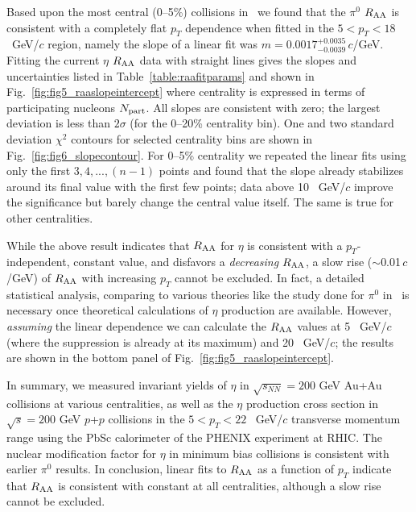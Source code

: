 \documentclass[aps,prc,superscriptaddress,showpacs,nofootinbib,floatfix,twocolumn]{revtex4}
\def\pt{$p_T$}
\def\pts{$p_T$ }
\def\gevc{~GeV/$c$}
\def\gevcs{~GeV/$c$ }
\def\raa{$R_{\rm AA}$}
\def\raas{$R_{\rm AA}$ }
\def\pp{$p$+$p$ }
\def\pizs{$\pi^{0}$ }
\def\hs{$\eta$ }
\begin{document}
Based upon the most central (0--5\%) collisions in~\cite{ppg079} we 
found that the \pizs \raas is consistent with a completely flat \pts 
dependence when fitted in the $5<p_T<18$\gevcs region, namely the 
slope of a linear fit was $m=0.0017^{+0.0035}_{-0.0039}\,c$/GeV.  
Fitting the current \hs \raas data with straight lines gives the 
slopes and uncertainties listed in Table~\ref{table:raafitparams} and 
shown in Fig.~\ref{fig:fig5_raaslopeintercept} where centrality is 
expressed in terms of participating nucleons $N_{\rm part}$.  All 
slopes are consistent with zero; the largest deviation is less than 
$2\sigma$ (for the 0--20\% centrality bin).  One and two standard 
deviation $\chi^2$ contours for selected centrality bins are shown in 
Fig.~\ref{fig:fig6_slopecontour}.  For 0--5\% centrality we repeated 
the linear fits using only the first $3,4,...,(n-1)$ points and found 
that the slope already stabilizes around its final value with the 
first few points; data above 10 \gevcs improve the significance but 
barely change the central value itself.  The same is true for other 
centralities.

While the above result indicates that \raas for \hs is consistent with 
a \pt-independent, constant value, and disfavors a {\it decreasing} 
\raa, a slow rise ($\sim$0.01\,$c$/GeV) of $R_{\rm AA}$ with 
increasing \pts cannot be excluded.  In fact, a detailed statistical 
analysis, comparing to various theories like the study done for \pizs 
in~\cite{ppg079} is necessary once theoretical calculations of \hs 
production are available.  However, {\it assuming} the linear 
dependence we can calculate the \raas values at 5 \gevcs (where the 
suppression is already at its maximum) and 20 \gevc; the results are 
shown in the bottom panel of Fig.~\ref{fig:fig5_raaslopeintercept}.



In summary, we measured invariant yields of \hs in $\sqrt{s_{NN}}=200$ 
GeV Au+Au collisions at various centralities, as well as the \hs 
production cross section in $\sqrt{s}=200$ GeV \pp collisions in the 
$5<$\pt$<22$ \gevcs transverse momentum range using the PbSc 
calorimeter of the PHENIX experiment at RHIC.  The nuclear 
modification factor for \hs in minimum bias collisions is consistent 
with earlier \pizs results.  In conclusion, linear fits to \raas as a 
function of \pts indicate that \raas is consistent with constant at 
all centralities, although a slow rise cannot be excluded.
\end{document}
